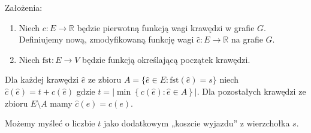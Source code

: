\documentclass[14pt]{article}
\begin{document}
Założenia:
\begin{enumerate}
  \item Niech $c: E\to \mathbb{R}$ będzie pierwotną funkcją wagi krawędzi w grafie $G$. Definiujemy nową, zmodyfikowaną funkcję wagi $\hat{c}: E\to \mathbb{R}$ na grafie $G$.
  \item Niech $\mathrm{fst}: E\to V$ będzie funkcją określającą początek krawędzi.
\end{enumerate}

Dla każdej krawędzi $\hat{e}$ ze zbioru $A = \{ \hat{e}\in E: \mathrm{fst}(\hat{e}) = s \}$ niech $\hat{c}(\hat{e}) = t + c(\hat{e})$ gdzie $t=\left|\min\left\{ c(\hat{e}): \hat{e} \in A \right\}\right|$. Dla pozostałych krawędzi ze zbioru $E\setminus A$ mamy $\hat{c}(e) = c(e)$.

Możemy myśleć o liczbie $t$ jako dodatkowym „koszcie wyjazdu” z wierzchołka $s$.
\end{document}
